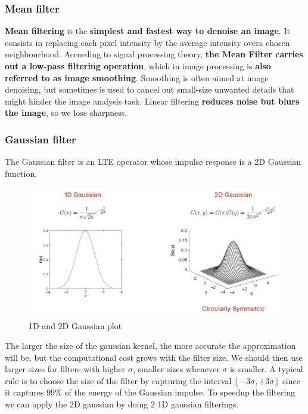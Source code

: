 \documentclass{article}
\begin{document}
\subsubsection{Mean filter}

\textbf{Mean filtering} is the \textbf{simplest and fastest way to denoise an image}.
It consists in replacing each pixel intensity by the average intensity overa chosen neighbourhood.
According to signal processing theory, \textbf{the Mean Filter carries out a low-pass filtering operation}, which in image processing is \textbf{also referred to as image smoothing}.
Smoothing is often aimed at image denoising, but sometimes is used to cancel out small-size unwanted details that might hinder the image analysis task.
Linear filtering \textbf{reduces noise but blurs the image}, so we lose sharpness.

\subsubsection{Gaussian filter}

The Gaussian filter is an LTE operator whose impulse response is a 2D Gaussian function.

\begin{figure}[htbp]
  \centering
  \includegraphics[width=0.7\linewidth]{./img/gaussian_filter.jpg}
  \caption{1D and 2D Gaussian plot}
  \label{fig:gaussian_filter}
\end{figure}

The larger the size of the gaussian kernel, the more accurate the approximation will be, but the computational cost grows with the filter size.
We should then use larger sizes for filters with higher $\sigma$, smaller sizes whenever $\sigma$ is smaller.
A typical rule is to choose the size of the filter by capturing the interval $[-3\sigma, +3\sigma]$ since it captures 99\% of the energy of the Gaussian impulse.
To speedup the filtering we can apply the 2D gaussian by doing 2 1D gaussian filterings.
\end{document}
